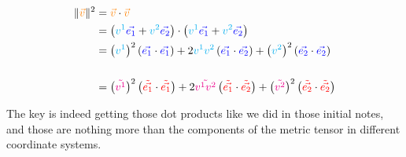 \begin{align*}
    \|\begingroup\color{orange}\vec{v}\endgroup\|^2 &= \begingroup\color{orange}\vec{v}\endgroup \cdot \begingroup\color{orange}\vec{v}\endgroup\\
    &= \left(\begingroup\color{cyan}v^1\endgroup \begingroup\color{blue}\vec{e_1}\endgroup + \begingroup\color{cyan}v^2\endgroup \begingroup\color{blue}\vec{e_2}\endgroup\right)
    \cdot \left(\begingroup\color{cyan}v^1\endgroup \begingroup\color{blue}\vec{e_1}\endgroup + \begingroup\color{cyan}v^2\endgroup \begingroup\color{blue}\vec{e_2}\endgroup\right)\\
    &= \bigl(\begingroup\color{cyan}v^1\endgroup\bigr)^2\left(\begingroup\color{blue}\vec{e_1}\endgroup\cdot\begingroup\color{blue}\vec{e_1}\endgroup\right)
    + 2 \begingroup\color{cyan}v^1v^2\endgroup\left(\begingroup\color{blue}\vec{e_1}\endgroup\cdot\begingroup\color{blue}\vec{e_2}\endgroup\right)
    + \bigl(\begingroup\color{cyan}v^2\endgroup\bigr)^2\left(\begingroup\color{blue}\vec{e_2}\endgroup\cdot\begingroup\color{blue}\vec{e_2}\endgroup\right) \\ \\
    &= \bigl(\begingroup\color{magenta}\tilde{v^1}\endgroup\bigr)^2\left(\begingroup\color{red}\tilde{\vec{e_1}}\endgroup\cdot\begingroup\color{red}\tilde{\vec{e_1}}\endgroup\right)
    + 2 \begingroup\color{magenta}\tilde{v^1v^2}\endgroup\left(\begingroup\color{red}\tilde{\vec{e_1}}\endgroup\cdot\begingroup\color{red}\tilde{\vec{e_2}}\endgroup\right)
    + \bigl(\begingroup\color{magenta}\tilde{v^2}\endgroup\bigr)^2\left(\begingroup\color{red}\tilde{\vec{e_2}}\endgroup\cdot\begingroup\color{red}\tilde{\vec{e_2}}\endgroup\right)
\end{align*}

The key is indeed getting those dot products like we did in those initial notes, and those are nothing more 
than the components of the metric tensor in different coordinate systems.\\

